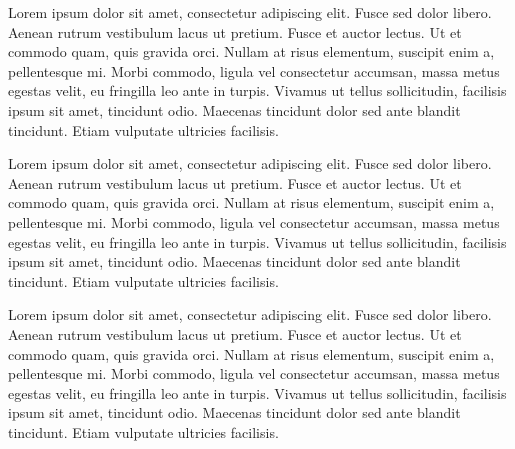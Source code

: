 \documentclass{book}
\begin{document}

\beginnumbering

\pstart
Lorem ipsum dolor sit amet, consectetur adipiscing elit. Fusce sed dolor libero. Aenean rutrum vestibulum lacus ut pretium. Fusce et auctor lectus. Ut et commodo quam, quis gravida orci. Nullam at risus elementum, suscipit enim a, pellentesque mi. Morbi commodo, ligula vel consectetur accumsan, massa metus egestas velit, eu fringilla leo ante in turpis. Vivamus ut tellus sollicitudin, facilisis ipsum sit amet, tincidunt odio. Maecenas tincidunt dolor sed ante blandit tincidunt. Etiam vulputate ultricies facilisis.
\pend
\endnumbering

\begin{pages}
\begin{Leftside}
\beginnumbering

\pstart
Lorem ipsum dolor sit amet, consectetur adipiscing elit. Fusce sed dolor libero. Aenean rutrum vestibulum lacus ut pretium. Fusce et auctor lectus. Ut et commodo quam, quis gravida orci. Nullam at risus elementum, suscipit enim a, pellentesque mi. Morbi commodo, ligula vel consectetur accumsan, massa metus egestas velit, eu fringilla leo ante in turpis. Vivamus ut tellus sollicitudin, facilisis ipsum sit amet, tincidunt odio. Maecenas tincidunt dolor sed ante blandit tincidunt. Etiam vulputate ultricies facilisis.
\pend
\endnumbering




\end{Leftside}
\begin{Rightside}
\beginnumbering

\pstart
Lorem ipsum dolor sit amet, consectetur adipiscing elit. Fusce sed dolor libero. Aenean rutrum vestibulum lacus ut pretium. Fusce et auctor lectus. Ut et commodo quam, quis gravida orci. Nullam at risus elementum, suscipit enim a, pellentesque mi. Morbi commodo, ligula vel consectetur accumsan, massa metus egestas velit, eu fringilla leo ante in turpis. Vivamus ut tellus sollicitudin, facilisis ipsum sit amet, tincidunt odio. Maecenas tincidunt dolor sed ante blandit tincidunt. Etiam vulputate ultricies facilisis.
\pend
\endnumbering

\end{Rightside}
\Pages
\end{pages}
\end{document}
